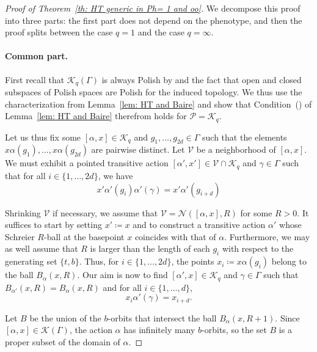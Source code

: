 \documentclass[12pt]{article}
\numberwithin{equation}{section}
\theoremstyle{definition}
\newcommand{\PK}{\mathcal{K}}
\begin{document}
\begin{proof}[Proof of Theorem~\ref{th: HT generic in Ph= 1 and oo}]
	
	We decompose this proof into three parts: the first part does not depend on the phenotype,
	and then the proof splits between the case $q=1$ and the case $q=\infty$. 
	
	
		\paragraph{Common part.}
	
	First recall that \(\mathcal K_q(\Gamma)\) is always Polish by \cite[Theorem~B]{CGLMS-22}
	and the fact that open and closed subspaces of Polish spaces are Polish for the induced topology.
	We thus use the characterization from Lemma~\ref{lem: HT and Baire} and show 
	that  Condition~(\textasteriskcentered) of Lemma~\ref{lem: HT and Baire} therefrom holds for \(\mathcal P=\PK_q \).
	
	\bigskip
	Let us thus fix some  $[\alpha,x]\in\PK_q $ and $g_1,\dots,g_{2d}\in\Gamma$
	such that the elements \(x\alpha(g_1),\dots,x\alpha(g_{2d})\) are pairwise distinct.
	Let \(\mathcal V\) be a neighborhood of $[\alpha,x]$. We must exhibit a pointed transitive action
	\([\alpha',x']\in \mathcal V\cap \PK_q \) and \(\gamma\in\Gamma\) such that for all 
	\(i\in\{1,\dots,2d\}\), we have 
	\[
	x'\alpha'(g_i) \alpha'(\gamma) = x'\alpha'(g_{i+d})
	\]

    Shrinking $\mathcal V$ if necessary, we assume that $\mathcal V=\mathcal N([\alpha,x],R)$ for some $R>0$.
    It suffices to start by setting $x'\coloneqq x$ and to construct a transitive
    action \(\alpha'\) whose Schreier \(R\)-ball at the basepoint $x$ coincides with that of \( \alpha \).
    Furthermore, we may as well assume that $R$ is larger than the length of each $g_i$ 
    with respect to the generating set $\{t,b\}$. Thus, for \(i\in\{1,\dots,2d\}\), the points \(x_i \coloneqq x\alpha(g_i)\) belong to the ball \( B_\alpha(x,R)\).
    Our aim is now to find \([\alpha',x]\in\PK_q \) 
    and \(\gamma\in\Gamma\) such that 
    \(B_{\alpha'}(x,R)=B_\alpha(x,R)\)
    and for all \(i\in\{1,\dots,d\}\), \[x_i\alpha'(\gamma)=x_{i+d}.\]	 
    
    Let \(B\) be the union of the \(b\)-orbits that intersect the ball $B_\alpha(x,R+1)$. 
	 Since $[\alpha,x]\in\mathcal K(\Gamma)$, the action $\alpha$ has infinitely many $b$-orbits, so the set \(B\) is a proper subset of the domain of $\alpha$.


\end{proof}
\end{document}
